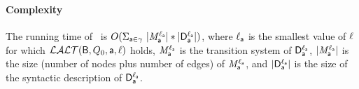  
\paragraph{Complexity} The running  time of \ is
$O(\Sigma_{\mathsf{a} \in \gamma}\  |\mathit{M}_{\mathsf{a}}^{\ell_{\mathsf{a}}}| * |\mathsf{D}_{\mathsf{a}}^{\ell_{\mathsf{a}}}|)$, 
where 
$\ell_{\mathsf{a}}$ is the smallest value of $\ell$ for which $\mathcal{LALT}(\mathsf{B}, Q_0, \mathsf{a}, \ell)$ holds, 
$\mathit{M}_{\mathsf{a}}^{\ell_{\mathsf{a}}}$ is the transition system of $\mathsf{D}_{\mathsf{a}}^{\ell_{\mathsf{a}}}$, 
$|\mathit{M}_{\mathsf{a}}^{\ell_{\mathsf{a}}}|$ is the size (number of nodes plus number of edges) of $\mathit{M}_{\mathsf{a}}^{\ell_{\mathsf{a}}}$, and
$|\mathsf{D}_{\mathsf{a}}^{\ell_{\mathsf{a}}}|$ is the size of the syntactic description of $\mathsf{D}_{\mathsf{a}}^{\ell_{\mathsf{a}}}$.





